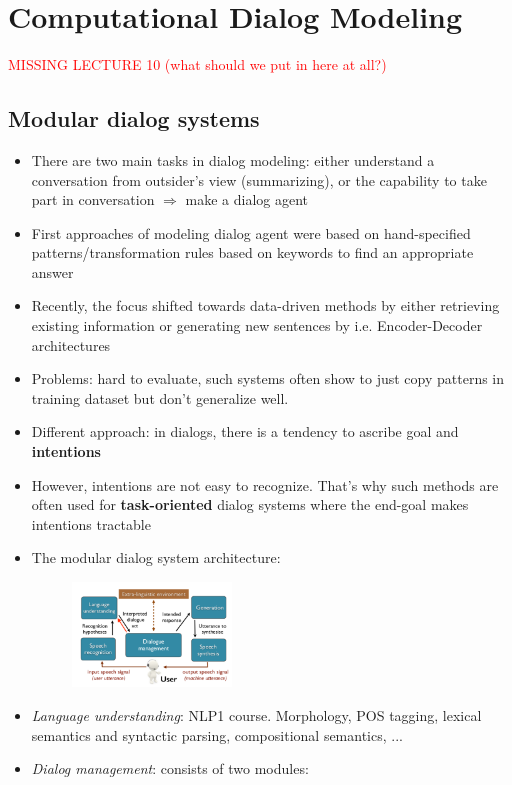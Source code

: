 \section{Computational Dialog Modeling}
\textcolor{red}{MISSING LECTURE 10 (what should we put in here at all?)}
\subsection{Modular dialog systems}
\begin{itemize}
	\item There are two main tasks in dialog modeling: either understand a conversation from outsider's view (summarizing), or the capability to take part in conversation $\Rightarrow$ make a dialog agent
	\item First approaches of modeling dialog agent were based on hand-specified patterns/transformation rules based on keywords to find an appropriate answer
	\item Recently, the focus shifted towards data-driven methods by either retrieving existing information or generating new sentences by i.e. Encoder-Decoder architectures
	\item Problems: hard to evaluate, such systems often show to just copy patterns in training dataset but don't generalize well.
	\item Different approach: in dialogs, there is a tendency to ascribe goal and \textbf{intentions}
	\item However, intentions are not easy to recognize. That's why such methods are often used for \textbf{task-oriented} dialog systems where the end-goal makes intentions tractable
	\item The modular dialog system architecture: 
	\begin{figure}[ht]
		\centering
		\includegraphics[width=0.4\textwidth]{figures/dialog_modeling_modules.png}
	\end{figure}
	\item \textit{Language understanding}: NLP1 course. Morphology, POS tagging, lexical semantics and syntactic parsing, compositional semantics, ...
	\item \textit{Dialog management}: consists of two modules:

\end{itemize}
